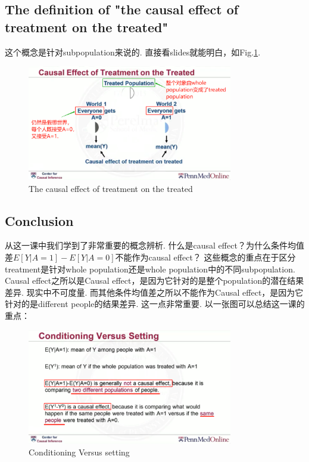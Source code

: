 \subsection{The definition of "the causal effect of treatment on the treated"}
这个概念是针对subpopulation来说的. 直接看slides就能明白，如Fig.\ref{CETT}.
\begin{figure}[htbp]
	\setlength{\abovecaptionskip}{0pt}     %
	\setlength{\belowcaptionskip}{10pt}
	\vspace{-0cm}  %
	\setlength{\abovecaptionskip}{-0cm}   %
	\setlength{\belowcaptionskip}{-0cm}   %
	\centering
	\includegraphics[width=0.8\textwidth]{figure/CETT.png}
	\caption{The causal effect of treatment on the treated}
	\label{CETT}
\end{figure}

\subsection{Conclusion}
从这一课中我们学到了非常重要的概念辨析. 什么是causal effect？为什么条件均值差$E[Y|A=1]-E[Y|A=0]$不能作为causal effect？
这些概念的重点在于区分{\color{red}treatment是针对whole population还是whole population中的不同subpopulation. }
Causal effect之所以是Causal effect，是因为它针对的是整个population的潜在结果差异. 现实中不可度量. 而其他条件均值差之所以不能作为Causal effect，是因为它针对的是different people的结果差异.
这一点非常重要. 以一张图可以总结这一课的重点：
\begin{figure}[htbp]
	\setlength{\abovecaptionskip}{0pt}     %
	\setlength{\belowcaptionskip}{10pt}
	\vspace{-0cm}  %
	\setlength{\abovecaptionskip}{-0cm}   %
	\setlength{\belowcaptionskip}{-0cm}   %
	\centering
	\includegraphics[width=0.8\textwidth]{figure/ConditionVSsetting.png}
	\caption{Conditioning Versus setting}
	\label{ConditionVSsetting}
\end{figure}

